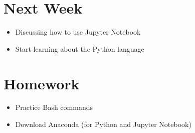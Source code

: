 \documentclass[12pt]{article}
\numberwithin{equation}{section}
\begin{document}
\section{Next Week}
\begin{itemize}
    \item Discussing how to use Jupyter Notebook
    \item Start learning about the Python language
\end{itemize}


\section{Homework}
\begin{itemize}
    \item Practice Bash commands
    \item Download Anaconda (for Python and Jupyter Notebook)
\end{itemize}
\end{document}

